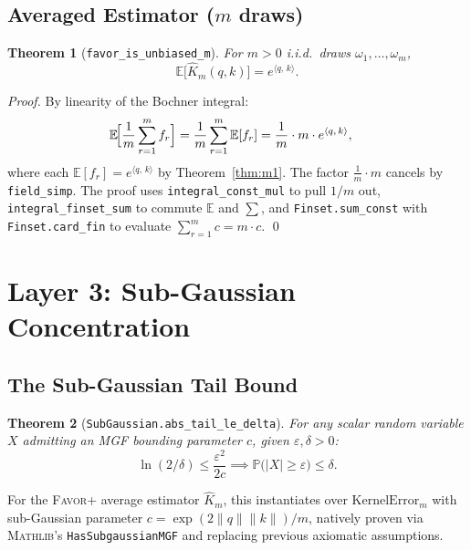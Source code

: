\documentclass[11pt,a4paper,twocolumn]{article}
\newtheorem{theorem}{Theorem}[section]
\theoremstyle{definition}
\theoremstyle{remark}
\newcommand{\E}{\mathbb{E}}
\newcommand{\Prob}{\mathbb{P}}
\newcommand{\favor}{\textsc{Favor+}}
\newcommand{\mathlib}{\textsc{Mathlib}}
\newcommand{\ip}[2]{\langle #1,\, #2 \rangle}
\newcommand{\leancode}[1]{\texttt{\color{leanblue}#1}}
\begin{document}
\subsection{Averaged Estimator ($m$ draws)}

\begin{theorem}[\leancode{favor\_is\_unbiased\_m}]
\label{thm:mm}
For $m > 0$ i.i.d.\ draws $\omega_1, \ldots, \omega_m$,
\begin{equation}
  \E\!\bigl[\hat{K}_m(q,k)\bigr] = e^{\ip{q}{k}}.
\end{equation}
\end{theorem}

\begin{proof}
By linearity of the Bochner integral:
\begin{align}
  &\E\!\Bigl[\frac{1}{m}\sum_{r=1}^{m} f_r\Bigr]
  = \frac{1}{m} \sum_{r=1}^{m} \E[f_r]
  = \frac{1}{m} \cdot m \cdot e^{\ip{q}{k}},
\end{align}
where each $\E[f_r] = e^{\ip{q}{k}}$ by Theorem~\ref{thm:m1}.
The factor $\frac{1}{m} \cdot m$ cancels by \leancode{field\_simp}. The
proof uses \leancode{integral\_const\_mul} to pull $1/m$ out,
\leancode{integral\_finset\_sum} to commute $\E$ and $\sum$, and
\leancode{Finset.sum\_const} with \leancode{Finset.card\_fin} to
evaluate $\sum_{r=1}^{m} c = m \cdot c$.
\qed
\end{proof}


\section{Layer 3: Sub-Gaussian Concentration}
\label{sec:layer3}

\subsection{The Sub-Gaussian Tail Bound}

\begin{theorem}[\leancode{SubGaussian.abs\_tail\_le\_delta}]
\label{thm:hoeffding}
For any scalar random variable $X$ admitting an MGF bounding parameter $c$, given $\varepsilon, \delta > 0$:
\begin{equation}
  \ln(2/\delta) \leq \frac{\varepsilon^2}{2c} \implies \Prob\!\bigl(|X| \geq \varepsilon\bigr) \leq \delta.
\end{equation}
\end{theorem}

For the \favor{} average estimator $\hat{K}_m$, this instantiates over
$\mathrm{KernelError}_m$ with sub-Gaussian parameter 
$c = \exp(2\|q\|\|k\|)/m$, natively proven via \mathlib{}'s \leancode{HasSubgaussianMGF} and replacing previous axiomatic assumptions.
\end{document}

